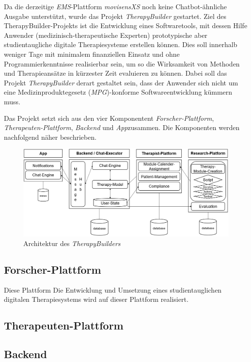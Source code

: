 Da die derzeitige \emph{EMS}-Plattform \emph{movisensXS} noch keine Chatbot-ähnliche Ausgabe unterstützt, wurde das Projekt \emph{TherapyBuilder} gestartet. Ziel des TherapyBuilder-Projekts ist die Entwicklung eines Softwaretools, mit dessen Hilfe Anwender (medizinisch-therapeutische Experten) prototypische aber studientaugliche digitale Therapiesysteme erstellen können. Dies soll innerhalb weniger Tage mit minimalem finanziellen Einsatz und ohne Programmierkenntnisse realisierbar sein, um so die Wirksamkeit von Methoden und Therapieansätze in kürzester Zeit evaluieren zu können. Dabei soll das Projekt \emph{TherapyBuilder} derart gestaltet sein, dass der Anwender sich nicht um eine Medizinproduktegesetz (\emph{MPG})-konforme Softwareentwicklung kümmern muss. 

Das Projekt setzt sich aus den vier Komponentent \emph{Forscher-Plattform}, \emph{Therapeuten-Plattform}, \emph{Backend} und \emph{App}zusammen. Die Komponenten werden nachfolgend näher beschrieben.

\begin{figure}[h]
\centering
\includegraphics[width=1\textwidth]{pictures/TherapyBuilder}
\caption{Architektur des \emph{TherapyBuilders}}
\label{therapyBuilder}
\end{figure}


\subsection{Forscher-Plattform}

Diese Plattform Die Entwicklung und Umsetzung eines studientauglichen digitalen Therapiesystems wird auf dieser Plattform realisiert.  


\subsection{Therapeuten-Plattform}
\subsection{Backend}
